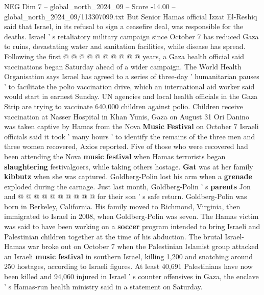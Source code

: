 \begin{textsample}{NEG Dim 7 – global\_north\_2024\_09 – Score -14.00 – global\_north\_2024\_09/113307099.txt}
But Senior Hamas official Izzat El-Reshiq said that Israel, in its refusal to sign a ceasefire deal, was responsible for the deaths.
Israel ' s retaliatory military campaign since October 7 has reduced Gaza to ruins, devastating water and sanitation facilities, while disease has spread.
Following the first @ @ @ @ @ @ @ @ @ @ years, a Gaza health official said vaccinations began Saturday ahead of a wider campaign.
The World Health Organisation says Israel has agreed to a series of three-day ' humanitarian pauses ' to facilitate the polio vaccination drive, which an international aid worker said would start in earnest Sunday.
UN agencies and local health officials in the Gaza Strip are trying to vaccinate 640,000 children against polio.
Children receive vaccination at Nasser Hospital in Khan Yunis, Gaza on August 31 Ori Danino was taken captive by Hamas from the Nova \textbf{Music} \textbf{Festival} on October 7 Israeli officials said it took ' many hours ' to identify the remains of the three men and three women recovered, Axios reported.
Five of those who were recovered had been attending the Nova \textbf{music} \textbf{festival} when Hamas terrorists began \textbf{slaughtering} festivalgoers, while taking others hostage. \textbf{Gat} was at her family \textbf{kibbutz} when she was captured.
Goldberg-Polin lost his arm when a \textbf{grenade} exploded during the carnage.
Just last month, Goldberg-Polin ' s \textbf{parents} Jon and @ @ @ @ @ @ @ @ @ @ for their son ' s safe return.
Goldberg-Polin was born in Berkeley, California.
His family moved to Richmond, Virginia, then immigrated to Israel in 2008, when Goldberg-Polin was seven.
The Hamas victim was said to have been working on a \textbf{soccer} program intended to bring Israeli and Palestinian children together at the time of his abduction.
The brutal Israel-Hamas war broke out on October 7 when the Palestinian Islamist group attacked an Israeli \textbf{music} \textbf{festival} in southern Israel, killing 1,200 and snatching around 250 hostages, according to Israeli figures.
At least 40,691 Palestinians have now been killed and 94,060 injured in Israel ' s counter offensives in Gaza, the enclave ' s Hamas-run health ministry said in a statement on Saturday.

\end{textsample}
